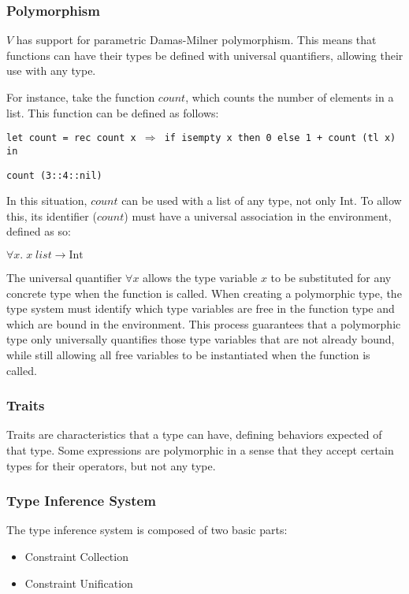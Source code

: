 \documentclass{article}
\def\code#1{\begin{footnotesize}\texttt{#1}\end{footnotesize}}
\begin{document}
\subsubsection{Polymorphism}\label{Polymorphism}

$V$ has support for parametric Damas\hyp Milner polymorphism.
This means that functions can have their types be defined with universal quantifiers, allowing their use with any type.

For instance, take the function $count$, which counts the number of elements in a list.
This function can be defined as follows:

\smallskip

\code{let count = rec count x $\Rightarrow$ if isempty x then 0 else 1 + count (tl x) in}

\code{count (3::4::nil)}

\smallskip

In this situation, $count$ can be used with a list of any type, not only Int.
To allow this, its identifier ($count$) must have a universal association in the environment, defined as so:

\smallskip
$\forall x. \; x \; list \rightarrow \mbox{Int}$
\smallskip

The universal quantifier $\forall x$ allows the type variable $x$ to be substituted for any concrete type when the function is called.
When creating a polymorphic type, the type system must identify which type variables are free in the function type and which are bound in the environment.
This process guarantees that a polymorphic type only universally quantifies those type variables that are not already bound, while still allowing all free variables to be instantiated when the function is called.

\subsubsection{Traits}

Traits are characteristics that a type can have, defining behaviors expected of that type.
Some expressions are polymorphic in a sense that they accept certain types for their operators, but not any type.

\subsubsection{Type Inference System}

The type inference system is composed of two basic parts:
\begin{itemize}
  \item Constraint Collection
  \item Constraint Unification
\end{itemize}
\end{document}
